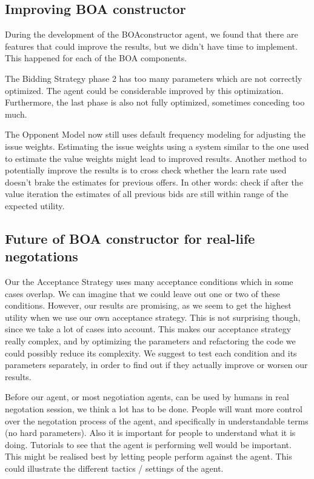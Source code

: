 \subsection{Improving BOA constructor}
During the development of the BOAconstructor agent, we found that there are features that could improve the results, but we didn't have time to implement. This happened for each of the BOA components.

The Bidding Strategy phase 2 has too many parameters which are not correctly optimized.
The agent could be considerable improved by this optimization. Furthermore, 
the last phase is also not fully optimized, sometimes conceding too much.

The Opponent Model now still uses default frequency modeling for adjusting the issue weights. Estimating the issue weights using a system similar to the one used to estimate the value weights might lead to improved results. Another method to potentially improve the results is to cross check whether the learn rate used doesn't brake the estimates for previous offers. In other words: check if after the value iteration the estimates of all previous bids are still within range of the expected utility. 

\subsection{Future of BOA constructor for real-life negotations}
Our the Acceptance Strategy uses many acceptance conditions which in some cases overlap. We can imagine that we could leave out one or two of these conditions. However, our results are promising, as we seem to get the highest utility when we use our own acceptance strategy. This is not surprising though, since we take a lot of cases into account. This makes our acceptance strategy really complex, and by optimizing the parameters and refactoring the code we could possibly reduce its complexity. We suggest to test each condition and its parameters separately, in order to find out if they actually improve or worsen our results.

Before our agent, or most negotiation agents, can be used by humans in real negotation 
session, we think a lot has to be done. People will want more control over the 
negotation process of the agent, and specifically in understandable terms (no hard parameters).
Also it is important for people to understand what it is doing. 
Tutorials to see that the agent is performing well would be important. 
This might be realised best by letting people perform against the agent. 
This could illustrate the different tactics / settings of the agent.

